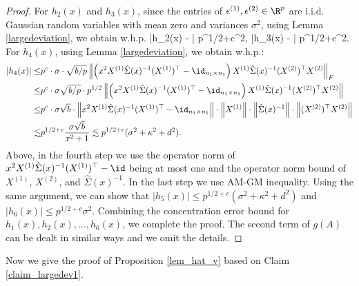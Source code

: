 \documentclass[aos,preprint]{imsart}
\begin{document}
\begin{proof}
For $h_2(x)$ and $h_3(x)$, since the entries of $\epsilon^{(1)},\epsilon^{(2)}\in \R^p$ are i.i.d. Gaussian random variables with mean zero and variances $\sigma^2$, using Lemma \ref{largedeviation}, we obtain w.h.p.
\be\label{eq_hA23}\left|h_2(x) - \right| \lesssim p^{1/2+c}\sigma^2, \quad \left|h_3(x) - \right| \lesssim p^{1/2+c}\sigma^2.\ee
For $h_4(x)$, using Lemma \ref{largedeviation}, we obtain w.h.p.:
\begin{align}
			\left|h_4(x)\right|
	\le& p^{c}\cdot \sigma \cdot \sqrt{b / p}\left\| \left(x^2 X^{(1)}\hat\Sigma(x)^{-1} (X^{(1)})^\top-\id_{n_1\times n_1}\right) X^{(1)} \hat\Sigma(x)^{-1} (X^{(2)})^\top X^{(2)} \right\|_F\nonumber \\
	\le& p^{c}\cdot \sigma \sqrt{b / p} \cdot p^{1/2} \left\| \left(x^2 X^{(1)}\hat\Sigma(x)^{-1} (X^{(1)})^\top-\id_{n_1\times n_1}\right) X^{(1)} \hat\Sigma(x)^{-1} (X^{(2)})^\top X^{(2)} \right\|  \nonumber\\
	\le&  p^{c}\cdot \sigma \sqrt{b} \cdot \left\|  x^2 X^{(1)}\hat\Sigma(x)^{-1} (X^{(1)})^\top - \id_{n_1\times n_1} \right\| \cdot \left\|X^{(1)}\right\| \cdot \left\|\hat\Sigma(x)^{-1}\right\| \cdot \left\| (X^{(2)})^\top X^{(2)} \right\|  \nonumber\\
	\lesssim& p^{1/2+c}\frac{\sigma \sqrt{b}}{x^2+1} \lesssim p^{1/2+c}(\sigma^2 + \kappa^2 + d^2).\label{eq_hA4}
\end{align}
Above, in the fourth step we use the operator norm of $x^2 X^{(1)}\hat\Sigma(x)^{-1} (X^{(1)})^\top - \id$ being at most one and the operator norm bound of $X^{(1)}$, $X^{(2)}$, and $\hat{\Sigma}(x)^{-1}$.
In the last step we use AM-GM inequality. Using the same argument, we can show that
$\left|h_5(x)\right| \le p^{1/2+c}(\sigma^2 + \kappa^2 + d^2)$ and $\left|h_6(x)\right| \le p^{1/2+c}\sigma^2$.
Combining the concentration error bound for $h_1(x), h_2(x), \dots, h_6(x)$, we complete the proof.
The second term of $g(A)$ can be dealt in similar ways and we omit the details. \fi
\end{proof}


Now we give the proof of Proposition \ref{lem_hat_v} based on Claim \ref{claim_largedev1}.
\end{document}
